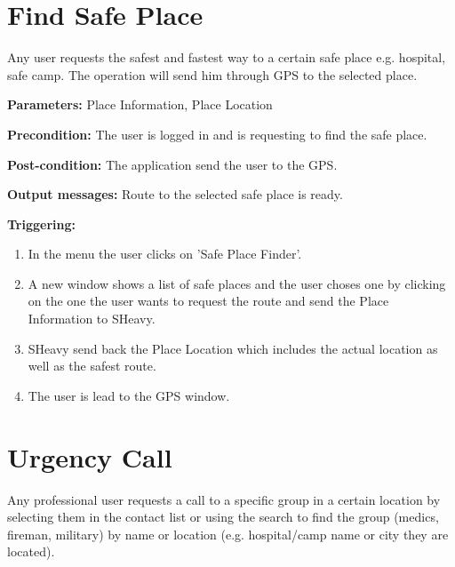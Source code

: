 \section{Find Safe Place}
\label{operation:FindSafePlace}
Any user requests the safest and fastest way to a certain safe place e.g. hospital,
safe camp. The operation will send him through GPS to the selected place.\\

\begin{description}

\item \textbf{Parameters:} Place Information, Place Location
\item \textbf{Precondition:} The user is logged in and is requesting to find the safe place.
\item \textbf{Post-condition:}  The application send the user to the GPS.
\item \textbf{Output messages:} Route to the selected safe place is ready.

\item \textbf{Triggering:}
\begin{enumerate}
\item In the menu the user clicks on 'Safe Place Finder'.
\item A new window shows a list of safe places and the user choses one by 
clicking on the one the user wants to request the route and send the Place Information to SHeavy.
\item SHeavy send back the Place Location which includes the actual location as well as the safest route.
\item The user is lead to the GPS window.
\end{enumerate}
\end{description}

\section{Urgency Call}
\label{operation:UrgencyCall}
Any professional user requests a call to a specific group in a certain location by selecting 
them in the contact list or using the search to find the group (medics, fireman, military) 
by name or location (e.g. hospital/camp name or city they are located).\\


